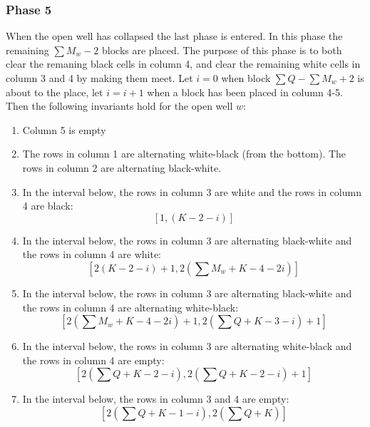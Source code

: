 \subsubsection{Phase 5}
When the open well has collapsed the last phase is entered. In this phase the remaining $\sum M_w - 2$ blocks are placed. The purpose of this phase is to both clear the remaning black cells in column 4, and clear the remaining white cells in column 3 and 4 by making them meet. Let $i = 0$ when block $\sum Q -  \sum M_w + 2$ is about to the place, let $i = i +1$ when a block has been placed in column 4-5. Then the following invariants hold for the open well $w$:

\begin{enumerate}
\item Column 5 is empty
\item The rows in column 1 are alternating white-black (from the bottom). The rows in column 2 are alternating black-white.
\item In the interval below, the rows in column 3 are white and the rows in column 4 are black:
\begin{equation*}
    \left[1, \left( K - 2 -i \right)\right]
\end{equation*}
\item In the interval below, the rows in column 3 are alternating black-white and the rows in column 4 are white:
\begin{equation*}
    \left[2 \left( K-2-i\right) +1, 2 \left(\sum M_w + K -4 -2i \right)\right]
\end{equation*}
\item In the interval below, the rows in column 3 are alternating black-white and the rows in column 4 are alternating white-black:
\begin{equation*}
    \left[ 2 \left(\sum M_w + K -4 -2i \right) +1, 2 \left( \sum Q + K - 3 -i\right) + 1 \right]
\end{equation*}
\item In the interval below, the rows in column 3 are alternating white-black and the rows in column 4 are empty:
\begin{equation*}
    \left[ 2 \left( \sum Q + K - 2 -i\right), 2 \left( \sum Q + K - 2 -i \right)+1 \right]
\end{equation*}
\item In the interval below, the rows in column 3 and 4 are empty:
\begin{equation*}
    \left[ 2 \left( \sum Q + K - 1 -i\right), 2 \left( \sum Q + K \right) \right]
\end{equation*}

\end{enumerate}

